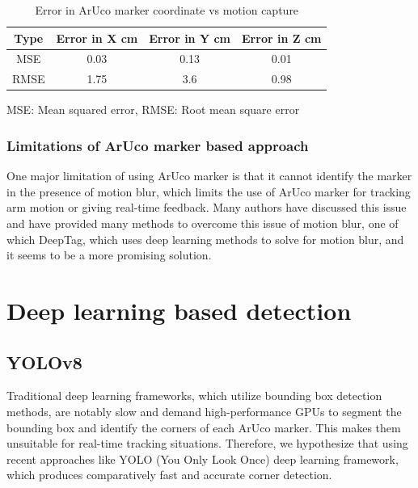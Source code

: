 \documentclass[12pt, twoside]{report}
\begin{document}

\begin{table}[hbt!]
    \centering
    \begin{tabular}{|c|c|c|c|}
        \hline
        \textbf{Type} & \textbf{Error in X cm} & \textbf{Error in Y cm} & \textbf{Error in Z cm} \\ \hline
        MSE           & 0.03                   & 0.13                   & 0.01                   \\ \hline
        RMSE          & 1.75                   & 3.6                    & 0.98                   \\ \hline
    \end{tabular}
    \caption{Error in ArUco marker coordinate vs motion capture}
    {MSE: Mean squared error, RMSE: Root mean square error}
    \label{tab:aruco}
\end{table}



\subsection{Limitations of ArUco marker based approach}
One major limitation of using ArUco marker is that it cannot
identify the marker in the presence of motion blur,
which limits the use of ArUco marker for tracking arm motion
or giving real-time feedback. Many authors have discussed this
issue and have provided many methods to overcome this issue of motion blur,
one of which DeepTag, which uses deep learning methods to solve for motion blur,
and it seems to be a more promising solution.




\chapter{Deep learning based detection}
\section{YOLOv8}

Traditional deep learning frameworks,
which utilize bounding box detection methods,
are notably slow and demand high-performance GPUs to segment the bounding
box and identify the corners of each ArUco marker.
This makes them unsuitable for real-time tracking situations.
Therefore, we hypothesize that using recent approaches like YOLO
(You Only Look Once) deep learning framework,
which produces comparatively
fast and accurate corner detection.
\end{document}
